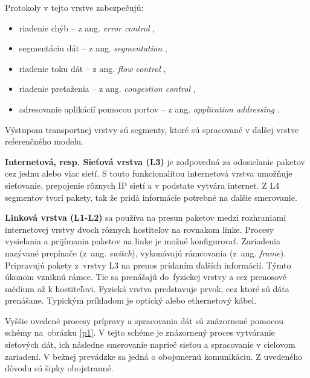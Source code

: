 Protokoly v tejto vrstve zabezpečujú:
\begin{itemize}
	\item{riadenie chýb} -- z ang. \textit{error control} \cite{ec},
	\item{segmentáciu dát} -- z ang. \textit{segmentation} \cite{sd},
	\item{riadenie toku dát} -- z ang. \textit{flow control} \cite{fc},
	\item{riadenie preťaženia} -- z ang. \textit{congestion control} \cite{cc},
	\item{adresovanie aplikácií pomocou portov} -- z ang. \textit{application addressing} \cite{aa}.
\end{itemize}
Výstupom transportnej vrstvy sú segmenty, ktoré sú spracované v ďalšej vrstve referenčného modelu. 

\textbf{Internetová, resp. Sieťová vrstva (L3)} je zodpovedná za odosielanie paketov cez jednu alebo viac sietí. S touto funkcionalitou internetová vrstva umožňuje sieťovanie, prepojenie rôznych IP sietí a v podstate vytvára internet. Z L4 segmentov tvorí pakety, tak že pridá informácie potrebné na ďalšie smerovanie. 

\textbf{Linková vrstva (L1-L2)} sa používa na presun paketov medzi rozhraniami internetovej vrstvy dvoch rôznych hostiteľov na rovnakom linke. Procesy vysielania a prijímania paketov na linke je možné konfigurovať. Zariadenia nazývané prepínače (z~ang. \textit{switch}), vykonávajú rámcovania (z~ang. \textit{frame}). Pripravujú pakety z~vrstvy L3 na prenos pridaním ďalších informácií. Týmto úkonom vzniknú rámce. Tie sa prenášajú do~fyzickej vrstvy a cez prenosové médium až k hostiteľovi. Fyzická vrstva predstavuje prvok, cez ktoré sú dáta prenášane. Typickým príkladom je optický alebo ethernetový kábel. 

Vyššie uvedené procesy prípravy a spracovania dát sú znázornené pomocou schémy na~obrázku \ref{p1}. V tejto schéme je znázornený proces vytváranie sieťových dát, ich následne smerovanie naprieč sieťou a spracovanie v cieľovom zariadení. V bežnej prevádzke sa jedná o obojsmernú komunikáciu. Z uvedeného dôvodu sú šipky obojstranné. 


